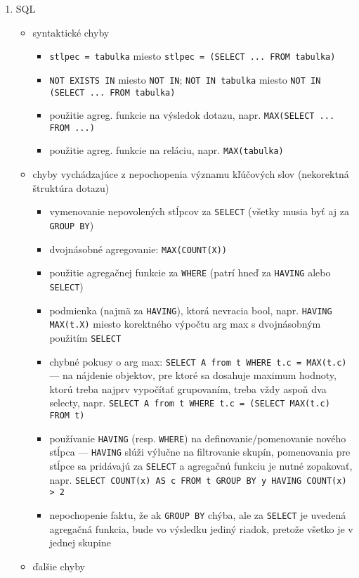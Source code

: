 \documentclass[10pt, a4paper]{article}
\theoremstyle{definition}
\begin{document}
\begin{enumerate}
\item SQL
\begin{itemize}
\item syntaktické chyby
    \begin{itemize}    
    \item \verb|stlpec = tabulka| miesto \verb|stlpec = (SELECT ... FROM tabulka)|
    \item \verb|NOT EXISTS IN| miesto \verb|NOT IN|; \verb|NOT IN tabulka| miesto \verb|NOT IN (SELECT ... FROM tabulka)|
    \item použitie agreg. funkcie na výsledok dotazu, napr. \verb|MAX(SELECT ... FROM ...)|
    \item použitie agreg. funkcie na reláciu, napr. \verb|MAX(tabulka)|
    \end{itemize}
\item chyby vychádzajúce z nepochopenia významu kľúčových slov (nekorektná štruktúra dotazu)
    \begin{itemize}
    \item vymenovanie nepovolených stĺpcov za \verb|SELECT| (všetky musia byť aj za \verb|GROUP BY|)
    \item dvojnásobné agregovanie: \verb|MAX(COUNT(X))|
    \item použitie agregačnej funkcie za \verb|WHERE| (patrí hneď za \verb|HAVING| alebo \verb|SELECT|)
    \item podmienka (najmä za \verb|HAVING|), ktorá nevracia bool, napr. \verb|HAVING MAX(t.X)| miesto korektného výpočtu arg max s dvojnásobným použitím \verb|SELECT|
    \item chybné pokusy o arg max: \verb|SELECT A from t WHERE t.c = MAX(t.c)| --- na nájdenie objektov, pre ktoré sa dosahuje maximum hodnoty, ktorú treba najprv vypočítať grupovaním, treba vždy aspoň dva selecty, napr. \verb|SELECT A from t WHERE t.c = (SELECT MAX(t.c) FROM t)|
    \item používanie \verb|HAVING| (resp. \verb|WHERE|) na definovanie/pomenovanie nového stĺpca --- \verb|HAVING| slúži výlučne na filtrovanie skupín, pomenovania pre stĺpce sa pridávajú za \verb|SELECT| a agregačnú funkciu je nutné zopakovať, napr. \verb|SELECT COUNT(x) AS c FROM t GROUP BY y HAVING COUNT(x) > 2|
    \item nepochopenie faktu, že ak \verb|GROUP BY| chýba, ale za \verb|SELECT| je uvedená agregačná funkcia, bude vo výsledku jediný riadok, pretože všetko je v jednej skupine
    \end{itemize}
\item ďalšie chyby

\end{itemize}
\end{enumerate}
\end{document}
